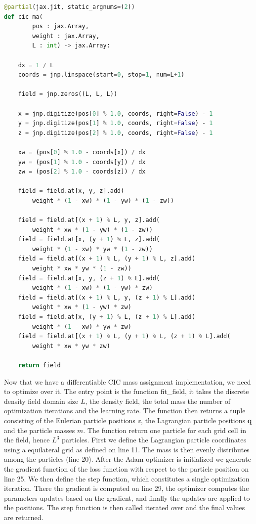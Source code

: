 \documentclass{article}
\begin{document}
{\begin{appendices}
\begin{lstlisting}[language=Python]
@partial(jax.jit, static_argnums=(2))
def cic_ma(
        pos : jax.Array, 
        weight : jax.Array, 
        L : int) -> jax.Array:
        
    dx = 1 / L
    coords = jnp.linspace(start=0, stop=1, num=L+1)

    field = jnp.zeros((L, L, L))

    x = jnp.digitize(pos[0] % 1.0, coords, right=False) - 1
    y = jnp.digitize(pos[1] % 1.0, coords, right=False) - 1
    z = jnp.digitize(pos[2] % 1.0, coords, right=False) - 1

    xw = (pos[0] % 1.0 - coords[x]) / dx
    yw = (pos[1] % 1.0 - coords[y]) / dx
    zw = (pos[2] % 1.0 - coords[z]) / dx

    field = field.at[x, y, z].add(
        weight * (1 - xw) * (1 - yw) * (1 - zw))
        
    field = field.at[(x + 1) % L, y, z].add(
        weight * xw * (1 - yw) * (1 - zw))
    field = field.at[x, (y + 1) % L, z].add(
        weight * (1 - xw) * yw * (1 - zw))
    field = field.at[(x + 1) % L, (y + 1) % L, z].add(
        weight * xw * yw * (1 - zw))
    field = field.at[x, y, (z + 1) % L].add(
        weight * (1 - xw) * (1 - yw) * zw)
    field = field.at[(x + 1) % L, y, (z + 1) % L].add(
        weight * xw * (1 - yw) * zw)
    field = field.at[x, (y + 1) % L, (z + 1) % L].add(
        weight * (1 - xw) * yw * zw)
    field = field.at[(x + 1) % L, (y + 1) % L, (z + 1) % L].add(
        weight * xw * yw * zw)

    return field
\end{lstlisting}

Now that we have a differentiable CIC mass assignment implementation, we need to optimize over it. The entry point is the function fit\_field, it takes the discrete density field domain size $L$, the density field, the total mass the number of optimization iterations and the learning rate. The function then returns a tuple consisting of the Eulerian particle positions $\mathbb{x}$, the Lagrangian particle positions $\mathbf{q}$ and the particle masses $m$. The function return one particle for each grid cell in the field, hence $L^3$ particles.
First we define the Lagrangian particle coordinates using a equilateral grid as defined on line 11. The mass is then evenly distributes among the particles (line 20). After the Adam optimizer is initialized we generate the gradient function of the loss function with respect to the particle position on line 25. We then define the step function, which constitutes a single optimization iteration. There the gradient is computed on line 29, the optimizer computes the parameters updates based on the gradient, and finally the updates are applied to the positions. The step function is then called iterated over and the final values are returned.


\end{appendices}}
\end{document}

